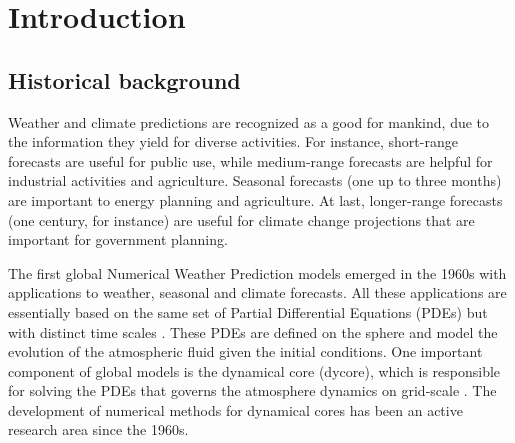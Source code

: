 

\chapter{Introduction}
\label{cap:introduction}

\enlargethispage{.5\baselineskip}

\section{Historical background}

Weather and climate predictions are recognized as a good for mankind,
due to the information they yield for diverse activities. 
For instance, short-range forecasts are useful for public use, while
medium-range forecasts are helpful for industrial activities and agriculture. 
Seasonal forecasts (one up to three months) are important to energy planning and agriculture.
At last, longer-range forecasts (one century, for instance) are useful for climate change 
projections that are important for government planning.

The first global Numerical Weather Prediction models emerged in the 1960s
with applications to weather, seasonal and climate forecasts. 
All these applications are essentially based on the same set of Partial Differential Equations
(PDEs) but with distinct time scales \citep{stan:2008}. These PDEs are defined on the sphere
and model the evolution of the atmospheric fluid given the initial conditions.
One important component of global models is the dynamical core (dycore), which is responsible
for solving the PDEs that governs the atmosphere dynamics on grid-scale \citep{will:2007}. 
The development of numerical methods for dynamical cores has been an active research area since the 1960s.

